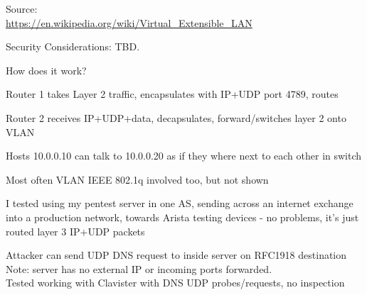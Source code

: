 \documentclass[Screen16to9,17pt]{foils}
\begin{document}

Source:\\
\url{https://en.wikipedia.org/wiki/Virtual_Extensible_LAN}

\vskip 1cm
Security Considerations:   TBD.




How does it work?

\begin{list2}
\item Router 1 takes Layer 2 traffic, encapsulates with IP+UDP port 4789, routes
\item Router 2 receives IP+UDP+data, decapsulates, forward/switches layer 2 onto VLAN
\item Hosts 10.0.0.10 can talk to 10.0.0.20 as if they where next to each other in switch
\item Most often VLAN IEEE 802.1q involved too, but not shown
\end{list2}



I tested using my pentest server in one AS, sending across an internet exchange into a production network, towards Arista testing devices - no problems, it's just routed layer 3 IP+UDP packets



Attacker can send UDP DNS request to inside server on RFC1918 destination\\
Note: server has no external IP or incoming ports forwarded.\\
Tested working with Clavister with DNS UDP probes/requests, no inspection
\end{document}
